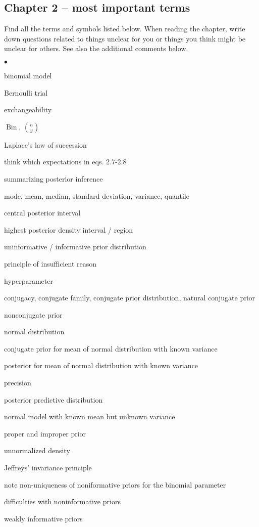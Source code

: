 \documentclass[a4paper,11pt,english]{article}
\DeclareMathOperator{\Bin}{Bin}
\begin{document}
\subsection*{Chapter 2 -- most important terms}

Find all the terms and symbols listed below. When reading the chapter,
write down questions related to things unclear for you or things you
think might be unclear for others. See also the additional comments below.
\begin{list}{$\bullet$}{\parsep=0pt\itemsep=2pt}
\item binomial model
\item Bernoulli trial
\item exchangeability
\item $\Bin$, $\binom{n}{y}$
\item Laplace's law of succession
\item think which expectations in eqs. 2.7-2.8
\item summarizing posterior inference
\item mode, mean, median, standard deviation, variance, quantile
\item central posterior interval
\item highest posterior density interval / region
\item uninformative / informative prior distribution
\item principle of insufficient reason
\item hyperparameter
\item conjugacy, conjugate family, conjugate prior distribution, natural conjugate prior
\item nonconjugate prior
\item normal distribution
\item conjugate prior for mean of normal distribution with known variance
\item posterior for mean of normal distribution with known variance
\item precision
\item posterior predictive distribution
\item normal model with known mean but unknown variance
\item proper and improper prior
\item unnormalized density
\item Jeffreys' invariance principle
\item note non-uniqueness of noniformative priors for the binomial parameter
\item difficulties with noninformative priors
\item weakly informative priors
\end{list}
\end{document}
